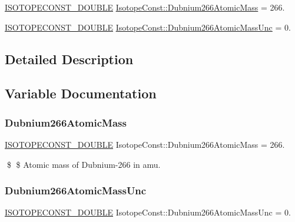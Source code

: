 \begin{DoxyCompactItemize}
\item 
\mbox{\hyperlink{group___isotope_const-_macros_ga8f45a7272ce02c0b4c65c44636ed719a}{I\+S\+O\+T\+O\+P\+E\+C\+O\+N\+S\+T\+\_\+\+D\+O\+U\+B\+LE}} \mbox{\hyperlink{group___isotope_const-_dubnium-_db266_ga67116db02bd3a9f6f44d5b58c33df922}{Isotope\+Const\+::\+Dubnium266\+Atomic\+Mass}} = 266.
\item 
\mbox{\hyperlink{group___isotope_const-_macros_ga8f45a7272ce02c0b4c65c44636ed719a}{I\+S\+O\+T\+O\+P\+E\+C\+O\+N\+S\+T\+\_\+\+D\+O\+U\+B\+LE}} \mbox{\hyperlink{group___isotope_const-_dubnium-_db266_gaff9a2acebd1ab239cd0aba431606aed1}{Isotope\+Const\+::\+Dubnium266\+Atomic\+Mass\+Unc}} = 0.
\end{DoxyCompactItemize}


\subsection{Detailed Description}


\subsection{Variable Documentation}
\mbox{\label{group___isotope_const-_dubnium-_db266_ga67116db02bd3a9f6f44d5b58c33df922}} 
\subsubsection{\texorpdfstring{Dubnium266\+Atomic\+Mass}{Dubnium266AtomicMass}}
{\footnotesize\ttfamily \mbox{\hyperlink{group___isotope_const-_macros_ga8f45a7272ce02c0b4c65c44636ed719a}{I\+S\+O\+T\+O\+P\+E\+C\+O\+N\+S\+T\+\_\+\+D\+O\+U\+B\+LE}} Isotope\+Const\+::\+Dubnium266\+Atomic\+Mass = 266.}

\$ \$ Atomic mass of Dubnium-\/266 in amu. \mbox{\label{group___isotope_const-_dubnium-_db266_gaff9a2acebd1ab239cd0aba431606aed1}} 
\subsubsection{\texorpdfstring{Dubnium266\+Atomic\+Mass\+Unc}{Dubnium266AtomicMassUnc}}
{\footnotesize\ttfamily \mbox{\hyperlink{group___isotope_const-_macros_ga8f45a7272ce02c0b4c65c44636ed719a}{I\+S\+O\+T\+O\+P\+E\+C\+O\+N\+S\+T\+\_\+\+D\+O\+U\+B\+LE}} Isotope\+Const\+::\+Dubnium266\+Atomic\+Mass\+Unc = 0.}

